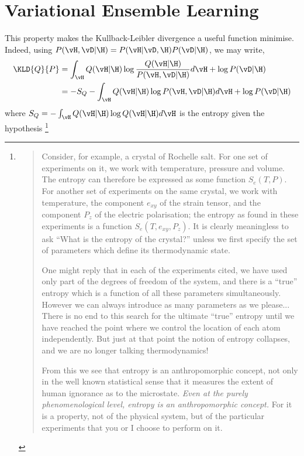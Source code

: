 {\section{Variational Ensemble Learning}


This property makes the Kullback-Leibler divergence a useful function minimise.
Indeed, using $P(\vH,\vD|\H) = P(\vH|\vD,\H) P(\vD|\H)$, 
we may write,
\begin{align}
  \KLD{Q}{P}  %
  &= \int_\vH Q(\vH|\H) \log\frac{Q(\vH|\H)}{P(\vH,\vD|\H)} d\vH  +  \log P(\vD|\H) \\
  &= -S_Q - \int_\vH Q(\vH|\H) \log P(\vH,\vD|\H)  d\vH + \log P(\vD|\H)
\end{align}
where $S_Q = - \int_\vH Q(\vH|\H) \log Q(\vH|\H) d\vH$ is the entropy given the hypothesis%
\footnote{
\begin{quote}
Consider, for example, a crystal of Rochelle salt.
For one set of experiments on it, we work with temperature, pressure and volume.
The entropy can therefore be expressed as some function $S_e(T,P)$.
For another set of experiments on the same crystal,
we work with temperature, the component $e_{xy}$ of the strain tensor,
and the component $P_z$ of the electric polarisation;
the entropy as found in these experiments is a function $S_e(T, e_{xy}, P_z)$.
It is clearly meaningless to ask ``What is the entropy of the crystal?''
unless we first specify the set of parameters which define its thermodynamic state.%

One might reply that in each of the experiments cited, 
we have used only part of the degrees of freedom of the system,
and there is a ``true'' entropy which is a function of all these parameters simultaneously.
However we can always introduce as many parameters as we please...
There is no end to this search for the ultimate ``true'' entropy until we have reached the point where we control
the location of each atom independently.
But just at that point the notion of entropy collapses, and we are no longer talking thermodynamics!

From this we see that entropy is an anthropomorphic concept,
not only in the well known statistical sense that it measures the extent of human ignorance as to the microstate.
{\em Even at the purely phenomenological level, entropy is an anthropomorphic concept.}
For it is a property, not of the physical system,
but of the particular experiments that you or I choose to perform on it.


\end{quote}}}

